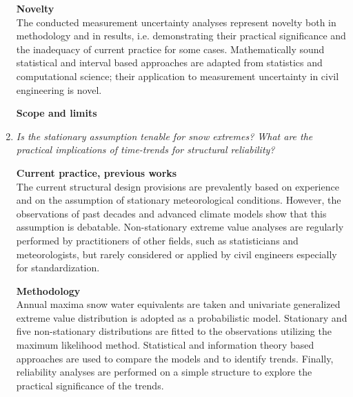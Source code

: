 \begin{enumerate}[leftmargin=*, align=left]
    \textbf{Novelty} \\
    The conducted measurement uncertainty analyses represent novelty both in methodology and in results, i.e. demonstrating their practical significance and the inadequacy of current practice for some cases. Mathematically sound statistical and interval based approaches are adapted from statistics and computational science; their application to measurement uncertainty in civil engineering is novel.
  
    \textbf{Scope and limits}

  \item \textit{Is the stationary assumption tenable for snow extremes? What are the practical implications of time-trends for structural reliability?}
  
    \textbf{Current practice, previous works} \\
    The current structural design provisions are prevalently based on experience and on the assumption of stationary meteorological conditions. However, the observations of past decades and advanced climate models show that this assumption is debatable. Non-stationary extreme value analyses are regularly performed by practitioners of other fields, such as statisticians and meteorologists, but rarely considered or applied by civil engineers especially for standardization.

    \textbf{Methodology} \\
    Annual maxima snow water equivalents are taken and univariate generalized extreme value distribution is adopted as a probabilistic model. Stationary and five non-stationary distributions are fitted to the observations utilizing the maximum likelihood method. Statistical and information theory based approaches are used to compare the models and to identify trends. Finally, reliability analyses are performed on a simple structure to explore the practical significance of the trends.


\end{enumerate}

